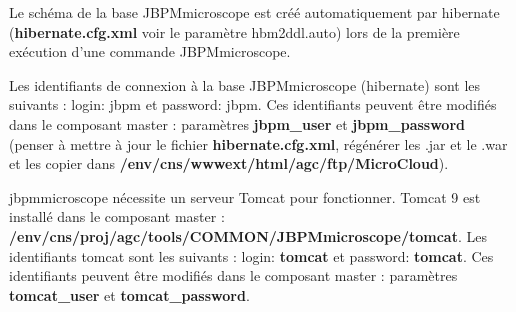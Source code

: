 Le schéma de la base JBPMmicroscope est créé automatiquement par hibernate (\textbf{hibernate.cfg.xml} voir le paramètre hbm2ddl.auto) lors de la première exécution d'une commande JBPMmicroscope.
\newline

Les identifiants de connexion à la base JBPMmicroscope (hibernate) sont les suivants :
login: jbpm et password: jbpm. Ces identifiants peuvent être modifiés dans le composant master : paramètres \textbf{jbpm\_user} et \textbf{jbpm\_password} (penser à mettre à jour le fichier \textbf{hibernate.cfg.xml}, régénérer les .jar et le .war et les copier dans \textbf{/env/cns/wwwext/html/agc/ftp/MicroCloud}).
\newline

jbpmmicroscope nécessite un serveur Tomcat pour fonctionner. Tomcat 9 est installé dans le composant master : \textbf{/env/cns/proj/agc/tools/COMMON/JBPMmicroscope/tomcat}. Les identifiants tomcat sont les suivants :
login: \textbf{tomcat} et password: \textbf{tomcat}. Ces identifiants peuvent être modifiés dans le composant master : paramètres \textbf{tomcat\_user} et \textbf{tomcat\_password}.
